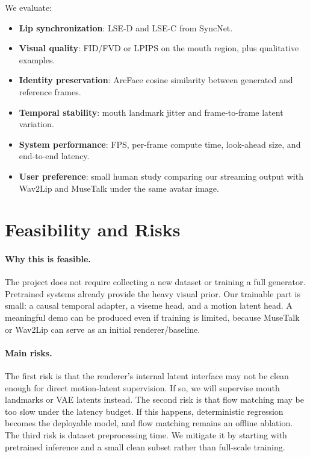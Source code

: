 \documentclass{article}
\begin{document}
We evaluate:
\begin{itemize}
    \item \textbf{Lip synchronization}: LSE-D and LSE-C from SyncNet.
    \item \textbf{Visual quality}: FID/FVD or LPIPS on the mouth region, plus qualitative examples.
    \item \textbf{Identity preservation}: ArcFace cosine similarity between generated and reference frames.
    \item \textbf{Temporal stability}: mouth landmark jitter and frame-to-frame latent variation.
    \item \textbf{System performance}: FPS, per-frame compute time, look-ahead size, and end-to-end latency.
    \item \textbf{User preference}: small human study comparing our streaming output with Wav2Lip and MuseTalk under the same avatar image.
\end{itemize}

\section{Feasibility and Risks}

\paragraph{Why this is feasible.}
The project does not require collecting a new dataset or training a full generator. Pretrained systems already provide the heavy visual prior. Our trainable part is small: a causal temporal adapter, a viseme head, and a motion latent head. A meaningful demo can be produced even if training is limited, because MuseTalk or Wav2Lip can serve as an initial renderer/baseline.

\paragraph{Main risks.}
The first risk is that the renderer's internal latent interface may not be clean enough for direct motion-latent supervision. If so, we will supervise mouth landmarks or VAE latents instead. The second risk is that flow matching may be too slow under the latency budget. If this happens, deterministic regression becomes the deployable model, and flow matching remains an offline ablation. The third risk is dataset preprocessing time. We mitigate it by starting with pretrained inference and a small clean subset rather than full-scale training.
\end{document}

